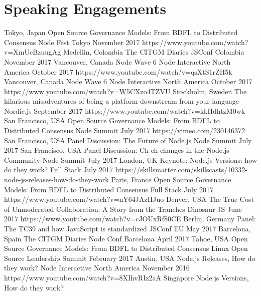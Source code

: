 \documentclass[10pt,a4paper,sans]{moderncv}   %
\begin{document}
 \section{Speaking Engagements}
 \cventry
   {Tokyo, Japan}
   {Open Source Governance Models: From BDFL to Distributed Consensus}
   {Node Fest Tokyo}
   {November 2017}{}
   {https://www.youtube.com/watch?v=XmUcBzuugAg}
 \cventry
   {Medellin, Colombia}
   {The CITGM Diaries}
   {JSConf Colombia}
   {November 2017}{}
   {}
 \cventry
   {Vancouver, Canada}
   {Node Wave 6}
   {Node Interactive North America}
   {October 2017}{}
   {https://www.youtube.com/watch?v=qsXtS1rZH5k}
 \cventry
   {Vancouver, Canada}
   {Node Wave 6}
   {Node Interactive North America}
   {October 2017}{}
   {https://www.youtube.com/watch?v=W5CXzo4TZVU}
 \cventry
   {Stockholm, Sweden}
   {The hilarious misadventures of being a platform downstream from your language}
   {Nordic.js}
   {September 2017}{}
   {https://www.youtube.com/watch?v=kkHdhtzM0wk}
 \cventry
   {San Francisco, USA}
   {Open Source Governance Models: From BDFL to Distributed Consensus}
   {Node Summit}
   {July 2017}{}
   {https://vimeo.com/230146372}
 \cventry
   {San Francisco, USA}
   {Panel Discussion: The Future of Node.js}
   {Node Summit}
   {July 2017}{}
   {}
 \cventry
   {San Francisco, USA}
   {Panel Discussion: Ch-ch-changes in the Node.js Community}
   {Node Summit}
   {July 2017}{}
   {}   
 \cventry
   {London, UK}
   {Keynote: Node.js Versions: how do they work?}
   {Full Stack}
   {July 2017}{}
   {https://skillsmatter.com/skillscasts/10332-node-js-releases-how-do-they-work}
 \cventry
   {Paris, France}
   {Open Source Governance Models: From BDFL to Distributed Consensus}
   {Full Stack}
   {July 2017}{}
   {https://www.youtube.com/watch?v=nY64JAzHJuo}
 \cventry
   {Denver, USA}
   {The True Cost of Unmoderated Collaboration: A Story from the Tranches}
   {Dinosaur JS}
   {June 2017}{}
   {https://www.youtube.com/watch?v=cJOUxRf80CE}
 \cventry
   {Berlin, Germany}
   {Panel: The TC39 and how JavaScript is standardized}
   {JSConf EU}
   {May 2017}{}
   {}
 \cventry
   {Barcelona, Spain}
   {The CITGM Diaries}
   {Node Conf Barcelona}
   {April 2017}{}
   {}
 \cventry
   {Tahoe, USA}
   {Open Source Governance Models: From BDFL to Distributed Consensus}
   {Linux Open Source Leadership Summit}
   {February 2017}{}
   {}
 \cventry
   {Austin, USA}
   {Node.js Releases, How do they work?}
   {Node Interactive North America}
   {November 2016}{}
   {https://www.youtube.com/watch?v=8XIhvRIz2aA}
 \cventry
   {Singapore}
   {Node.js Versions, How do they work?}
\end{document}
